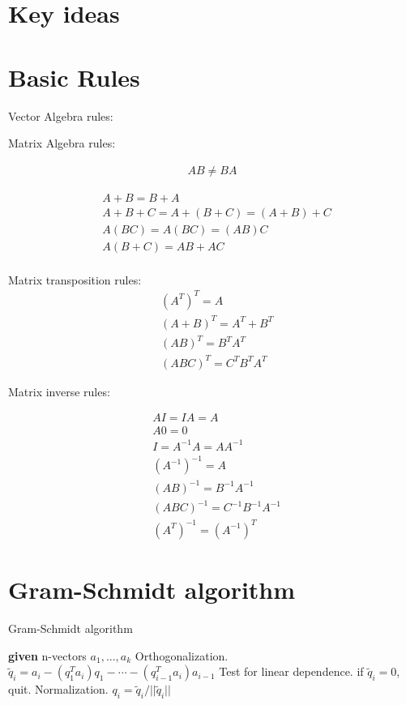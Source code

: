\documentclass{article}
\begin{document}
\section{Key ideas}


\section{Basic Rules}

Vector Algebra rules:

Matrix Algebra rules:

\begin{align}
    AB \ne BA
\end{align}

\begin{align}
    & A+B = B+A \\
    & A+B+C = A+(B+C) = (A+B)+C \\
    & A(BC)=A(BC)=(AB)C \\
    & A(B+C) = AB+ AC \\
\end{align}

Matrix transposition rules:
\begin{align}
    & (A^T)^T = A \\
    & (A+B)^T = A^T+B^T \\
    & (AB)^T = B^T A^T \\
    & (ABC)^T = C^T B^T A^T 
\end{align}

Matrix inverse rules:

\begin{align}
    &  AI = IA = A \\
    &  A0 = 0 \\
    &  I = A^{-1} A = A A^{-1} \\
    &  (A^{-1})^{-1} = A \\
    &  (AB)^{-1} = B^{-1} A^{-1}\\
    &  (ABC)^{-1} = C^{-1} B^{-1} A^{-1} \\
    &  (A^T)^{-1} = (A^{-1})^T 
\end{align}


\section{Gram-Schmidt algorithm}

\begin{algorithm}
    \caption{Gram-Schmidt algorithm}
    \begin{algorithmic}
        \State \textbf{given} n-vectors $a_1,...,a_k$
        \State Orthogonalization. $\tilde{q}_i = a_i - (q_1^T a_i) q_1 - \cdots - (q_{i-1}^T a_i) a_{i-1} $
        \State Test for linear dependence. if $\tilde{q}_i = 0$, quit.
        \State Normalization. $q_i = \tilde{q}_i / ||\tilde{q}_i||$
        \EndFor
    \end{algorithmic}
\end{algorithm}
\end{document}
